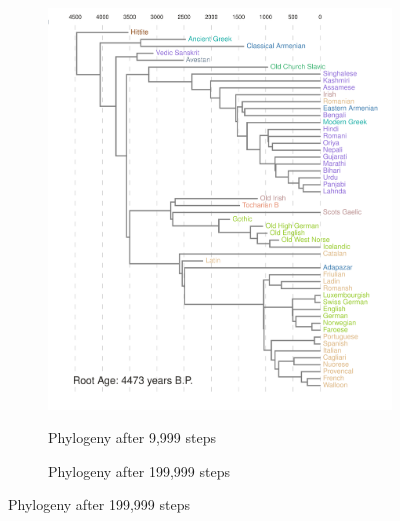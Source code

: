 \documentclass[10pt,journal,compsoc]{IEEEtran}
\begin{document}
\begin{figure}
     \centering
     \begin{subfigure}[b]{0.4\paperwidth}
         \centering
         \caption{Phylogeny after 9,999 steps}
         \includegraphics[width=\textwidth]{runs26-conv1}
         \label{fig:convtree1}
     \end{subfigure}
     \hfill
     \begin{subfigure}[b]{0.4\paperwidth}
         \centering
         \caption{Phylogeny after 199,999 steps}

\end{subfigure}
\end{figure}
\end{document}
